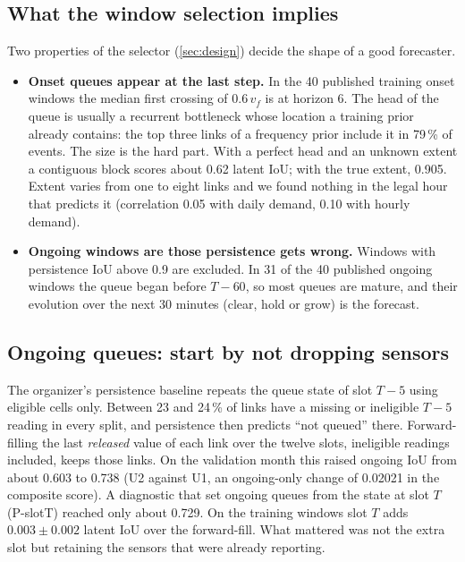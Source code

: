 \subsection{What the window selection implies}
Two properties of the selector (\cref{sec:design}) decide the shape of a good forecaster.
\begin{itemize}
  \item \textbf{Onset queues appear at the last step.} In the 40 published training onset windows the median first
        crossing of $0.6\,v_f$ is at horizon 6. The head of the queue is usually a recurrent bottleneck whose location
        a training prior already contains: the top three links of a frequency prior include it in 79\,\% of events. The
        size is the hard part. With a perfect head and an unknown extent a contiguous block scores about 0.62 latent IoU;
        with the true extent, 0.905. Extent varies from one to eight links and we found nothing in the legal hour that
        predicts it (correlation 0.05 with daily demand, 0.10 with hourly demand).
  \item \textbf{Ongoing windows are those persistence gets wrong.} Windows with persistence IoU above 0.9 are excluded.
        In 31 of the 40 published ongoing windows the queue began before $T{-}60$, so most queues are mature, and their
        evolution over the next 30 minutes (clear, hold or grow) is the forecast.
\end{itemize}

\subsection{Ongoing queues: start by not dropping sensors}\label{sec:ongoing}
The organizer's persistence baseline repeats the queue state of slot $T{-}5$ using eligible cells only. Between 23 and
24\,\% of links have a missing or ineligible $T{-}5$ reading in every split, and persistence then predicts ``not
queued'' there. Forward-filling the last \emph{released} value of each link over the twelve slots, ineligible readings
included, keeps those links. On the validation month this raised ongoing IoU from about 0.603 to 0.738 (U2 against
U1, an ongoing-only change of 0.02021 in the composite score). A diagnostic that set ongoing queues from the state at
slot $T$ (P-slotT) reached only about 0.729. On the training windows slot $T$ adds $0.003\pm0.002$ latent IoU over
the forward-fill. What mattered was not the extra slot but retaining the sensors that were already reporting.

